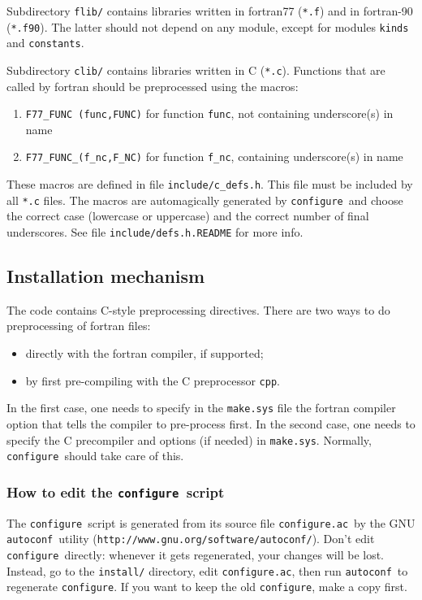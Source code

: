 \documentclass[12pt,a4paper]{article}
\def\configure{\texttt{configure}}
\def\configurac{\texttt{configure.ac}}
\def\autoconf{\texttt{autoconf}}
\begin{document}
Subdirectory \texttt{flib/} contains libraries written in fortran77 
(\texttt{*.f}) and in fortran-90 (\texttt{*.f90}).
The latter should not depend on any module, except for modules
\texttt{kinds} and \texttt{constants}.

Subdirectory \texttt{clib/} contains libraries written in C 
(\texttt{*.c}). Functions that are called by fortran
should be preprocessed using the macros:
\begin{enumerate}
\item \texttt{F77\_FUNC (func,FUNC)} for function \texttt{func}, not containing underscore(s) in name 
\item \texttt{F77\_FUNC\_(f\_nc,F\_NC)} for function \texttt{f\_nc}, containing underscore(s) in name
\end{enumerate}
These macros are defined in file \texttt{include/c\_defs.h}. This file must be included
by all \texttt{*.c} files. The macros are automagically generated by 
\configure\ and 
choose the correct case 
(lowercase or uppercase) and the correct number of final underscores. 
See file \texttt{include/defs.h.README} for more info.

\subsection{Installation mechanism}

\label{SubSec:Inst}
The code contains C-style preprocessing directives. There are two ways to do preprocessing of fortran files:
\begin{itemize}
\item directly with the fortran compiler, if supported;
\item by first pre-compiling with the C preprocessor \texttt{cpp}.
\end{itemize}

In the first case, one needs to specify in the \texttt{make.sys} file the fortran compiler option that tells the compiler to pre-process first. In the second case, one needs to
specify the C precompiler and options (if needed) in \texttt{make.sys}.
Normally, \configure\ should take care of this.

\subsubsection{ How to edit the \configure\ script}

The \configure\ script is generated from its source file
\configurac\ by the GNU \autoconf\ utility
(\texttt{http://www.gnu.org/software/autoconf/}).  Don't edit \configure\
directly: whenever it gets regenerated, your changes will be lost.
Instead, go to the \texttt{install/} directory, edit \configurac, 
then run \autoconf\ to regenerate \configure. If you want 
to keep the old \configure, make a copy
first.
\end{document}
